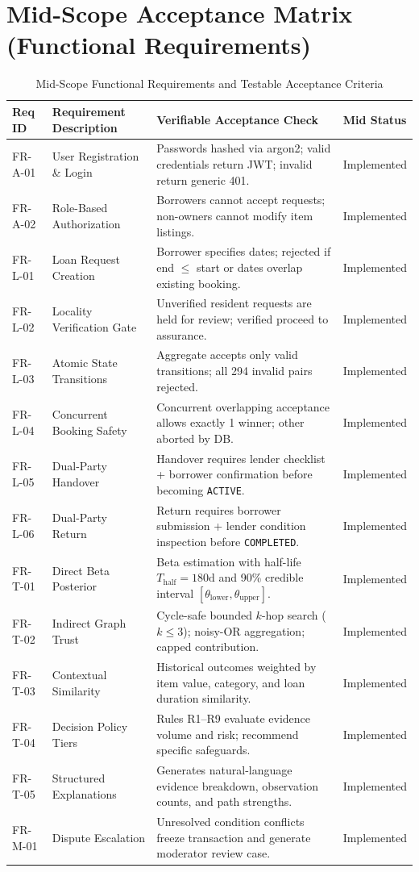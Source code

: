 \section{Mid-Scope Acceptance Matrix (Functional Requirements)}
\begin{table}[htbp]
\centering
\caption{Mid-Scope Functional Requirements and Testable Acceptance Criteria}
\label{tab:fr_acceptance_matrix}
\small
\begin{tabularx}{\textwidth}{l p{5cm} p{5.5cm} l}
\toprule
\textbf{Req ID} & \textbf{Requirement Description} & \textbf{Verifiable Acceptance Check} & \textbf{Mid Status} \\
\midrule
FR-A-01 & User Registration \& Login & Passwords hashed via argon2; valid credentials return JWT; invalid return generic 401. & Implemented \\
FR-A-02 & Role-Based Authorization & Borrowers cannot accept requests; non-owners cannot modify item listings. & Implemented \\
FR-L-01 & Loan Request Creation & Borrower specifies dates; rejected if end $\le$ start or dates overlap existing booking. & Implemented \\
FR-L-02 & Locality Verification Gate & Unverified resident requests are held for review; verified proceed to assurance. & Implemented \\
FR-L-03 & Atomic State Transitions & Aggregate accepts only valid transitions; all 294 invalid pairs rejected. & Implemented \\
FR-L-04 & Concurrent Booking Safety & Concurrent overlapping acceptance allows exactly 1 winner; other aborted by DB. & Implemented \\
FR-L-05 & Dual-Party Handover & Handover requires lender checklist + borrower confirmation before becoming \texttt{ACTIVE}. & Implemented \\
FR-L-06 & Dual-Party Return & Return requires borrower submission + lender condition inspection before \texttt{COMPLETED}. & Implemented \\
FR-T-01 & Direct Beta Posterior & Beta estimation with half-life $T_{\text{half}} = 180\text{d}$ and 90\% credible interval $[\theta_{\text{lower}}, \theta_{\text{upper}}]$. & Implemented \\
FR-T-02 & Indirect Graph Trust & Cycle-safe bounded $k$-hop search ($k \le 3$); noisy-OR aggregation; capped contribution. & Implemented \\
FR-T-03 & Contextual Similarity & Historical outcomes weighted by item value, category, and loan duration similarity. & Implemented \\
FR-T-04 & Decision Policy Tiers & Rules R1--R9 evaluate evidence volume and risk; recommend specific safeguards. & Implemented \\
FR-T-05 & Structured Explanations & Generates natural-language evidence breakdown, observation counts, and path strengths. & Implemented \\
FR-M-01 & Dispute Escalation & Unresolved condition conflicts freeze transaction and generate moderator review case. & Implemented \\
\bottomrule
\end{tabularx}
\end{table}

